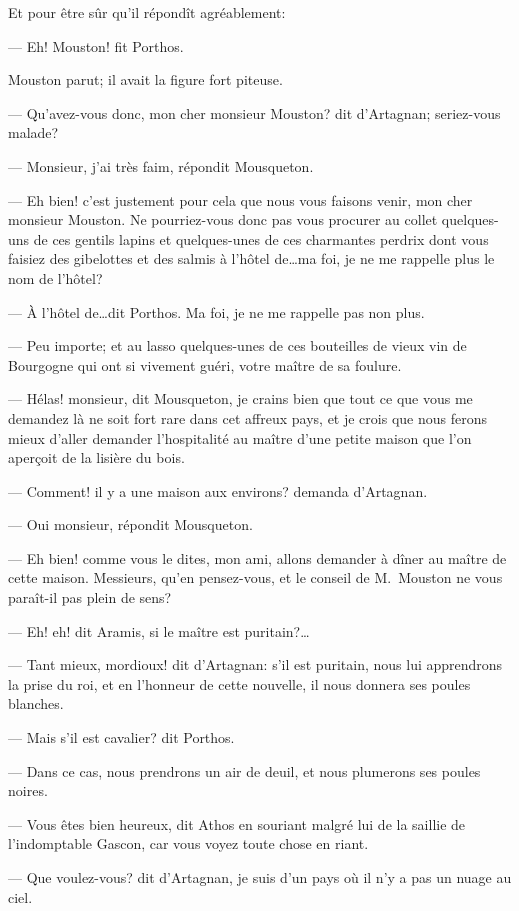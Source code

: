 Et pour être sûr qu'il répondît agréablement:

— Eh! Mouston! fit Porthos.

Mouston parut; il avait la figure fort piteuse.

— Qu'avez-vous donc, mon cher monsieur Mouston? dit d'Artagnan; seriez-vous malade?

— Monsieur, j'ai très faim, répondit Mousqueton.

— Eh bien! c'est justement pour cela que nous vous faisons venir, mon cher monsieur Mouston. Ne pourriez-vous donc pas vous procurer au collet quelques-uns de ces gentils lapins et quelques-unes de ces charmantes perdrix dont vous faisiez des gibelottes et des salmis à l'hôtel de\dots ma foi, je ne me rappelle plus le nom de l'hôtel?

— À l'hôtel de\dots dit Porthos. Ma foi, je ne me rappelle pas non plus.

— Peu importe; et au lasso quelques-unes de ces bouteilles de vieux vin de Bourgogne qui ont si vivement guéri, votre maître de sa foulure.

— Hélas! monsieur, dit Mousqueton, je crains bien que tout ce que vous me demandez là ne soit fort rare dans cet affreux pays, et je crois que nous ferons mieux d'aller demander l'hospitalité au maître d'une petite maison que l'on aperçoit de la lisière du bois.

— Comment! il y a une maison aux environs? demanda d'Artagnan.

— Oui monsieur, répondit Mousqueton.

— Eh bien! comme vous le dites, mon ami, allons demander à dîner au maître de cette maison. Messieurs, qu'en pensez-vous, et le conseil de M.~Mouston ne vous paraît-il pas plein de sens?

— Eh! eh! dit Aramis, si le maître est puritain?\dots

— Tant mieux, mordioux! dit d'Artagnan: s'il est puritain, nous lui apprendrons la prise du roi, et en l'honneur de cette nouvelle, il nous donnera ses poules blanches.

— Mais s'il est cavalier? dit Porthos.

— Dans ce cas, nous prendrons un air de deuil, et nous plumerons ses poules noires.

— Vous êtes bien heureux, dit Athos en souriant malgré lui de la saillie de l'indomptable Gascon, car vous voyez toute chose en riant.

— Que voulez-vous? dit d'Artagnan, je suis d'un pays où il n'y a pas un nuage au ciel.

